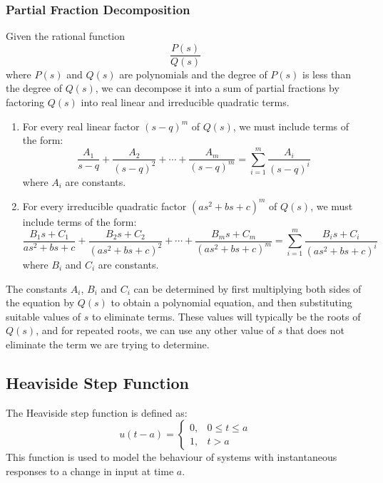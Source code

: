 \documentclass{article}
\begin{document}
\subsubsection{Partial Fraction Decomposition}
Given the rational function
\begin{equation*}
    \frac{P\left( s \right)}{Q\left( s \right)}
\end{equation*}
where \(P\left( s \right)\) and \(Q\left( s \right)\) are polynomials
and the degree of \(P\left( s \right)\) is less than the degree of
\(Q\left( s \right)\), we can decompose it into a sum of
partial fractions by factoring \(Q\left( s \right)\) into real linear
and irreducible quadratic terms.
\begin{enumerate}
    \item For every real linear factor \(\left( s - q \right)^m\) of
          \(Q\left( s \right)\), we must include terms of the form:
          \begin{equation*}
              \frac{A_1}{s - q} + \frac{A_2}{\left( s - q \right)^2} + \cdots + \frac{A_m}{\left( s - q \right)^m} =
              \sum_{i=1}^m \frac{A_i}{\left( s - q \right)^i}
          \end{equation*}
          where \(A_i\) are constants.
    \item For every irreducible quadratic factor \(\left( a s^2 + bs +
          c \right)^m\) of \(Q\left( s \right)\), we must include
          terms of the form:
          \begin{equation*}
              \frac{B_1 s + C_1}{a s^2 + b s + c} + \frac{B_2 s + C_2}{\left( a s^2 + b s + c \right)^2} + \cdots + \frac{B_m s + C_m}{\left( a s^2 + b s + c \right)^m} =
              \sum_{i=1}^m \frac{B_i s + C_i}{\left( a s^2 + b s + c \right)^i}
          \end{equation*}
          where \(B_i\) and \(C_i\) are constants.
\end{enumerate}
The constants \(A_i\), \(B_i\) and \(C_i\) can be determined by first
multiplying both sides of the equation by \(Q\left( s \right)\) to
obtain a polynomial equation, and then substituting suitable values of
\(s\) to eliminate terms. These values will typically be the roots of
\(Q\left( s \right)\), and for repeated roots, we can use any other
value of \(s\) that does not eliminate the term we are trying to
determine.
\subsection{Heaviside Step Function}
The Heaviside step function is defined as:
\begin{equation*}
    u\left( t - a \right) =
    \begin{cases}
        0, & 0 \leqslant t \leqslant a \\
        1, & t > a
    \end{cases}
\end{equation*}
This function is used to model the behaviour of systems
with instantaneous responses to a change in input at time \(a\).
\end{document}
